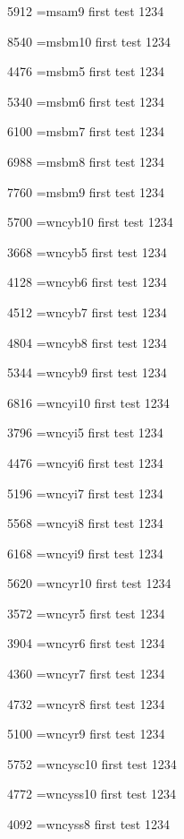 5912	\tstfont \font\tstfont=msam9 first test 1234 

8540	\tstfont \font\tstfont=msbm10 first test 1234 

4476	\tstfont \font\tstfont=msbm5 first test 1234 

5340	\tstfont \font\tstfont=msbm6 first test 1234 

6100	\tstfont \font\tstfont=msbm7 first test 1234 

6988	\tstfont \font\tstfont=msbm8 first test 1234 

7760	\tstfont \font\tstfont=msbm9 first test 1234 

5700	\tstfont \font\tstfont=wncyb10 first test 1234 

3668	\tstfont \font\tstfont=wncyb5 first test 1234 

4128	\tstfont \font\tstfont=wncyb6 first test 1234 

4512	\tstfont \font\tstfont=wncyb7 first test 1234 

4804	\tstfont \font\tstfont=wncyb8 first test 1234 

5344	\tstfont \font\tstfont=wncyb9 first test 1234 

6816	\tstfont \font\tstfont=wncyi10 first test 1234 

3796	\tstfont \font\tstfont=wncyi5 first test 1234 

4476	\tstfont \font\tstfont=wncyi6 first test 1234 

5196	\tstfont \font\tstfont=wncyi7 first test 1234 

5568	\tstfont \font\tstfont=wncyi8 first test 1234 

6168	\tstfont \font\tstfont=wncyi9 first test 1234 

5620	\tstfont \font\tstfont=wncyr10 first test 1234 

3572	\tstfont \font\tstfont=wncyr5 first test 1234 

3904	\tstfont \font\tstfont=wncyr6 first test 1234 

4360	\tstfont \font\tstfont=wncyr7 first test 1234 

4732	\tstfont \font\tstfont=wncyr8 first test 1234 

5100	\tstfont \font\tstfont=wncyr9 first test 1234 

5752	\tstfont \font\tstfont=wncysc10 first test 1234 

4772	\tstfont \font\tstfont=wncyss10 first test 1234 

4092	\tstfont \font\tstfont=wncyss8 first test 1234 

